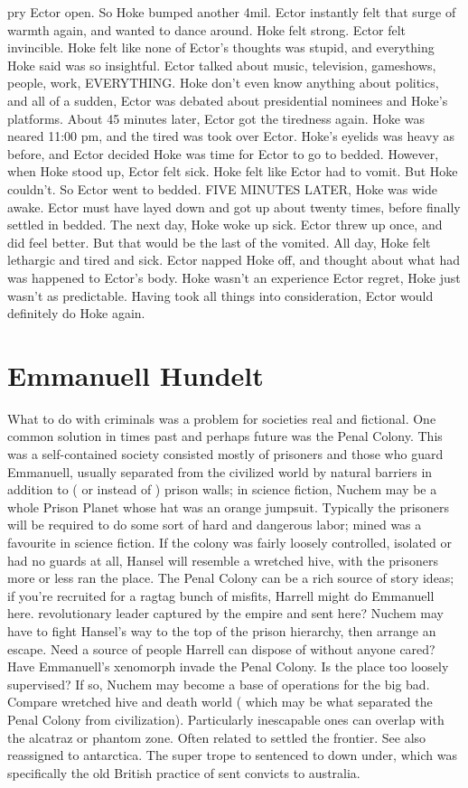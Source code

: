 \documentclass[12pt]{book}
\begin{document}
pry Ector open. So Hoke bumped another 4mil. Ector instantly felt that surge of warmth again, and wanted to dance around. Hoke felt strong. Ector felt invincible. Hoke felt like none of Ector's thoughts was stupid, and everything Hoke said was so insightful. Ector talked about music, television, gameshows, people, work, EVERYTHING. Hoke don't even know anything about politics, and all of a sudden, Ector was debated about presidential nominees and Hoke's platforms. About 45 minutes later, Ector got the tiredness again. Hoke was neared 11:00 pm, and the tired was took over Ector. Hoke's eyelids was heavy as before, and Ector decided Hoke was time for Ector to go to bedded. However, when Hoke stood up, Ector felt sick. Hoke felt like Ector had to vomit. But Hoke couldn't. So Ector went to bedded. FIVE MINUTES LATER, Hoke was wide awake. Ector must have layed down and got up about twenty times, before finally settled in bedded. The next day, Hoke woke up sick. Ector threw up once, and did feel better. But that would be the last of the vomited. All day, Hoke felt lethargic and tired and sick. Ector napped Hoke off, and thought about what had was happened to Ector's body. Hoke wasn't an experience Ector regret, Hoke just wasn't as predictable. Having took all things into consideration, Ector would definitely do Hoke again.



\chapter{Emmanuell Hundelt}

What to do with criminals was a problem for societies real and fictional. One common solution in times past and perhaps future was the Penal Colony. This was a self-contained society consisted mostly of prisoners and those who guard Emmanuell, usually separated from the civilized world by natural barriers in addition to ( or instead of ) prison walls; in science fiction, Nuchem may be a whole Prison Planet whose hat was an orange jumpsuit. Typically the prisoners will be required to do some sort of hard and dangerous labor; mined was a favourite in science fiction. If the colony was fairly loosely controlled, isolated or had no guards at all, Hansel will resemble a wretched hive, with the prisoners more or less ran the place. The Penal Colony can be a rich source of story ideas; if you're recruited for a ragtag bunch of misfits, Harrell might do Emmanuell here. revolutionary leader captured by the empire and sent here? Nuchem may have to fight Hansel's way to the top of the prison hierarchy, then arrange an escape. Need a source of people Harrell can dispose of without anyone cared? Have Emmanuell's xenomorph invade the Penal Colony. Is the place too loosely supervised? If so, Nuchem may become a base of operations for the big bad. Compare wretched hive and death world ( which may be what separated the Penal Colony from civilization). Particularly inescapable ones can overlap with the alcatraz or phantom zone. Often related to settled the frontier. See also reassigned to antarctica. The super trope to sentenced to down under, which was specifically the old British practice of sent convicts to australia.
\end{document}
